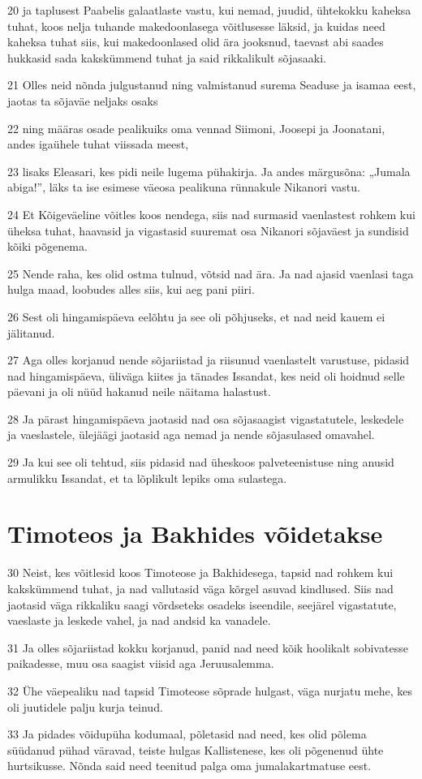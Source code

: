 \par 20 ja taplusest Paabelis galaatlaste vastu, kui nemad, juudid, ühtekokku kaheksa tuhat, koos nelja tuhande makedoonlasega võitlusesse läksid, ja kuidas need kaheksa tuhat siis, kui makedoonlased olid ära jooksnud, taevast abi saades hukkasid sada kakskümmend tuhat ja said rikkalikult sõjasaaki.
\par 21 Olles neid nõnda julgustanud ning valmistanud surema Seaduse ja isamaa eest, jaotas ta sõjaväe neljaks osaks
\par 22 ning määras osade pealikuiks oma vennad Siimoni, Joosepi ja Joonatani, andes igaühele tuhat viissada meest,
\par 23 lisaks Eleasari, kes pidi neile lugema pühakirja. Ja andes märgusõna: „Jumala abiga!”, läks ta ise esimese väeosa pealikuna rünnakule Nikanori vastu.
\par 24 Et Kõigeväeline võitles koos nendega, siis nad surmasid vaenlastest rohkem kui üheksa tuhat, haavasid ja vigastasid suuremat osa Nikanori sõjaväest ja sundisid kõiki põgenema.
\par 25 Nende raha, kes olid ostma tulnud, võtsid nad ära. Ja nad ajasid vaenlasi taga hulga maad, loobudes alles siis, kui aeg pani piiri.
\par 26 Sest oli hingamispäeva eelõhtu ja see oli põhjuseks, et nad neid kauem ei jälitanud.
\par 27 Aga olles korjanud nende sõjariistad ja riisunud vaenlastelt varustuse, pidasid nad hingamispäeva, üliväga kiites ja tänades Issandat, kes neid oli hoidnud selle päevani ja oli nüüd hakanud neile näitama halastust.
\par 28 Ja pärast hingamispäeva jaotasid nad osa sõjasaagist vigastatutele, leskedele ja vaeslastele, ülejäägi jaotasid aga nemad ja nende sõjasulased omavahel.
\par 29 Ja kui see oli tehtud, siis pidasid nad üheskoos palveteenistuse ning anusid armulikku Issandat, et ta lõplikult lepiks oma sulastega.


\section*{Timoteos ja Bakhides võidetakse}

\par 30 Neist, kes võitlesid koos Timoteose ja Bakhidesega, tapsid nad rohkem kui kakskümmend tuhat, ja nad vallutasid väga kõrgel asuvad kindlused. Siis nad jaotasid väga rikkaliku saagi võrdseteks osadeks iseendile, seejärel vigastatute, vaeslaste ja leskede vahel, ja nad andsid ka vanadele.
\par 31 Ja olles sõjariistad kokku korjanud, panid nad need kõik hoolikalt sobivatesse paikadesse, muu osa saagist viisid aga Jeruusalemma.
\par 32 Ühe väepealiku nad tapsid Timoteose sõprade hulgast, väga nurjatu mehe, kes oli juutidele palju kurja teinud.
\par 33 Ja pidades võidupüha kodumaal, põletasid nad need, kes olid põlema süüdanud pühad väravad, teiste hulgas Kallistenese, kes oli põgenenud ühte hurtsikusse. Nõnda said need teenitud palga oma jumalakartmatuse eest.


